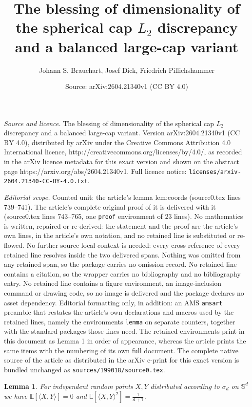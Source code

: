 \documentclass[10pt,a4paper]{amsart}
\title{The blessing of dimensionality of the spherical cap $L_2$ discrepancy and a balanced large-cap variant}
\author{Johann S. Brauchart, Josef Dick, Friedrich Pillichshammer}
\date{Source: arXiv:2604.21340v1 (CC BY 4.0)}
\newtheorem{lemma}{Lemma}
\begin{document}
\maketitle

\noindent\emph{Source and licence.} The blessing of dimensionality of the spherical cap $L_2$ discrepancy and a balanced large-cap variant. Version arXiv:2604.21340v1 (CC BY 4.0), distributed by arXiv under the Creative Commons Attribution 4.0 International licence, http://creativecommons.org/licenses/by/4.0/, as recorded in the arXiv licence metadata for this exact version and shown on the abstract page https://arxiv.org/abs/2604.21340v1. Full licence notice: \texttt{licenses/arxiv-2604.21340-CC-BY-4.0.txt}.\par\smallskip

\noindent\textit{Editorial scope.} Counted unit: the article's lemma lem:coords (source0.tex lines 739--741). The article's complete original proof of it is delivered with it (source0.tex lines 743--765, one \texttt{proof} environment of 23 lines). No mathematics is written, repaired or re-derived: the statement and the proof are the article's own lines, in the article's own notation, and no retained line is substituted or re-flowed.  No further source-local context is needed: every cross-reference of every retained line resolves inside the two delivered spans.  Nothing was omitted from any retained span, so the package carries no omission record.  No retained line contains a citation, so the wrapper carries no bibliography and no bibliography entry.  No retained line contains a figure environment, an image-inclusion command or drawing code, so no image is delivered and the package declares no asset dependency.  Editorial formatting only, in addition: an AMS \texttt{amsart} preamble that restates the article's own declarations and macros used by the retained lines, namely the environments \texttt{lemma} on separate counters, together with the standard packages those lines need.  The retained environments print in this document as Lemma 1 in order of appearance, whereas the article prints the same items with the numbering of its own full document.  The complete native source of the article as distributed in the arXiv e-print for this exact version is bundled unchanged as \texttt{sources/199018/source0.tex}.
\begin{lemma}\label{lem:coords}
For independent random points $X,Y$ distributed according to $\sigma_d$ on $\mathbb{S}^d$ we have $\mathbb{E}[\langle X,Y\rangle] = 0$ and $\mathbb{E}[\langle X,Y \rangle ^2] =\tfrac{1}{d+1}$.
\end{lemma}
\end{document}
